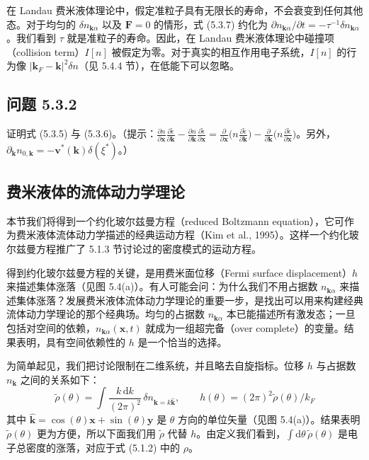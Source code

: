 在 Landau 费米液体理论中，假定准粒子具有无限长的寿命，不会衰变到任何其他态。对于均匀的 $\delta n_{\pmb{k}\alpha}$ 以及 $\pmb{F}=0$ 的情形，式 (5.3.7) 约化为 $\partial n_{\pmb{k}\alpha}/\partial t = -\tau^{-1}\delta n_{\pmb{k}\alpha}$。我们看到 $\tau$ 就是准粒子的寿命。因此，在 Landau 费米液体理论中碰撞项（collision term）$I[n]$ 被假定为零。对于真实的相互作用电子系统，$I[n]$ 的行为像 $|\pmb{k}_F - \pmb{k}|^{2}\delta n$（见 5.4.4 节），在低能下可以忽略。

\subsection*{问题 5.3.2}

证明式 (5.3.5) 与 (5.3.6)。（提示：$\frac{\partial n}{\partial \pmb{x}}\frac{\partial \tilde{\epsilon}}{\partial \pmb{k}} - \frac{\partial n}{\partial \pmb{k}}\frac{\partial \tilde{\epsilon}}{\partial \pmb{x}} = \frac{\partial}{\partial \pmb{x}}\Big( n\frac{\partial \tilde{\epsilon}}{\partial \pmb{k}} \Big) - \frac{\partial}{\partial \pmb{k}}\Big( n\frac{\partial \tilde{\epsilon}}{\partial \pmb{x}} \Big)$。另外，$\partial_{\pmb{k}} n_{0,\pmb{k}} = -\pmb{v}^{*}(\pmb{k})\delta(\xi^{*})$。）

\subsection{费米液体的流体动力学理论}

本节我们将得到一个约化玻尔兹曼方程（reduced Boltzmann equation），它可作为费米液体流体动力学描述的经典运动方程（Kim et al., 1995）。这样一个约化玻尔兹曼方程推广了 5.1.3 节讨论过的密度模式的运动方程。

得到约化玻尔兹曼方程的关键，是用费米面位移（Fermi surface displacement）$h$ 来描述集体涨落（见图 5.4(a)）。有人可能会问：为什么我们不用占据数 $n_{\pmb{k}\alpha}$ 来描述集体涨落？发展费米液体流体动力学理论的重要一步，是找出可以用来构建经典流体动力学理论的那个经典场。均匀的占据数 $n_{\pmb{k}\alpha}$ 本已能描述所有激发态；一旦包括对空间的依赖，$n_{\pmb{k}\alpha}(\pmb{x},t)$ 就成为一组超完备（over complete）的变量。结果表明，具有空间依赖性的 $h$ 是一个恰当的选择。

为简单起见，我们把讨论限制在二维系统，并且略去自旋指标。位移 $h$ 与占据数 $n_{\pmb{k}}$ 之间的关系如下：
\begin{equation*}
\tilde{\rho}(\theta) = \int \frac{k\,\mathrm{d}k}{(2\pi)^{2}}\, \delta n_{\pmb{k}=k\hat{\pmb{k}}}, \qquad h(\theta) = (2\pi)^{2} \tilde{\rho}(\theta)/k_F
\end{equation*}
其中 $\hat{\pmb{k}} = \cos(\theta)\pmb{x} + \sin(\theta)\pmb{y}$ 是 $\theta$ 方向的单位矢量（见图 5.4(a)）。结果表明 $\tilde{\rho}(\theta)$ 更为方便，所以下面我们用 $\tilde{\rho}$ 代替 $h$。由定义我们看到，$\int \mathrm{d}\theta\, \tilde{\rho}(\theta)$ 是电子总密度的涨落，对应于式 (5.1.2) 中的 $\rho$。

